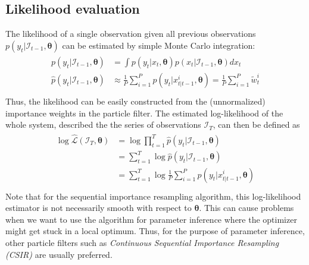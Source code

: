 \documentclass[11pt, oneside]{scrreprt}   	%
\begin{document}
\subsection{Likelihood evaluation}
The likelihood of a single observation given all previous observations $p(y_t | \mathcal{I}_{t-1}, \boldsymbol{\theta})$ can be estimated by simple Monte Carlo integration:\\
\begin{align} 
\begin{split}
p(y_t | \mathcal{I}_{t-1}, \boldsymbol{\theta}) &= \int p(y_t | x_t, \boldsymbol{\theta}) p(x_t | \mathcal{I}_{t-1}, \boldsymbol{\theta}) d x_t \\
\hat{p}(y_t | \mathcal{I}_{t-1}, \boldsymbol{\theta}) &\approx \frac{1}{P} \sum_{i=1}^P p(y_t | x_{t | t-1}^i, \boldsymbol{\theta}) = \frac{1}{P} \sum_{i=1}^P \tilde{w}_t^i\\
\end{split}					
\end{align}
Thus, the likelihood can be easily constructed from the (unnormalized) importance weights in the particle filter. The estimated log-likelihood of the whole system, described the the series of observations $\mathcal{I}_T$, can then be defined as\\
\begin{align} 
\begin{split}
\log \hat{\mathcal{L}}(\mathcal{I}_T, \boldsymbol{\theta}) &= \log \prod_{t=1}^T \hat{p}(y_t | \mathcal{I}_{t-1}, \boldsymbol{\theta}) \\
&= \sum_{t=1}^T \log \hat{p}(y_t | \mathcal{I}_{t-1}, \boldsymbol{\theta}) \\
&= \sum_{t=1}^T \log \frac{1}{P} \sum_{i=1}^P p(y_t | x_{t | t-1}^i, \boldsymbol{\theta}) \\
\end{split}					
\end{align} 
Note that for the sequential importance resampling algorithm, this log-likelihood estimator is not necessarily smooth with respect to $\boldsymbol{\theta}$. This can cause problems when we want to use the algorithm for parameter inference where the optimizer might get stuck in a local optimum. Thus, for the purpose of parameter inference, other particle filters such as \textit{Continuous Sequential Importance Resampling (CSIR)} are usually preferred.\\

\end{document}
